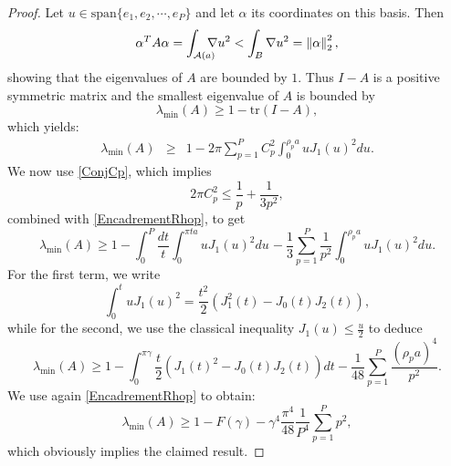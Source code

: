\documentclass{article}
\begin{document}
\begin{proof}
	Let $u \in \text{span}\{e_1,e_2,\cdots,e_P\}$ and let $\alpha$ its coordinates on this basis. Then 
	\[\alpha^T A \alpha = \int_{\mathcal{A}(a)} \!\!\!\!\! \nabla{u}^2 < \int_{B} \nabla{u}^2 = \left\|\alpha\right\|_2^2,\]
	showing that the eigenvalues of $A$ are bounded by $1$. Thus $I-A$ is a positive symmetric matrix and the smallest eigenvalue of $A$ is bounded by
	\[\lambda_{\min}(A) \geq 1 - \text{tr}(I - A),\]
	which yields:
	\begin{eqnarray*}
		\lambda_{\min}(A) &\geq& 1 - 2\pi \sum_{p=1}^{P}C_p^2\int_{0}^{\rho_p a} u J_1(u)^2 du.
	\end{eqnarray*}
	We now use  \autoref{ConjCp}, which implies
	\[2\pi C_p^2 \leq \dfrac{1}{p} + \dfrac{1}{3p^2},\]
	combined with \eqref{EncadrementRhop}, to get
	\[\lambda_{\min}(A) \geq 1 - \int_{0}^{P} \frac{dt}{t} \int_{0}^{\pi t a} u J_1(u)^2du \hspace{1pt} - \frac{1}{3}\sum_{p=1}^P \frac{1}{p^2} \int_{0}^{\rho_p a} u J_1(u)^2du.\]
	For the first term, we write 
	\[\int_0^t u J_1(u)^2 = \frac{t^2}{2} \left(J_1^2(t) - J_0(t)J_2(t)\right),\] 
	while for the second, we use the classical inequality $J_1(u) \leq \frac{u}{2}$ to deduce
	\[\lambda_{\min}(A) \geq 1 - \int_{0}^{\pi\gamma} \dfrac{t}{2} \left(J_1(t)^2 - J_0(t)J_2(t)\right)dt - \frac{1}{48} \sum_{p=1}^P \frac{(\rho_p a)^4}{p^2}.\]
	We use again \eqref{EncadrementRhop} to obtain:
	\[\lambda_{\min}(A) \geq 1 - F(\gamma) - \gamma^4\frac{\pi^4}{48} \frac{1}{P^4} \sum_{p=1}^P p^2,\]
	which obviously implies the claimed result.
\end{proof}
\end{document}
